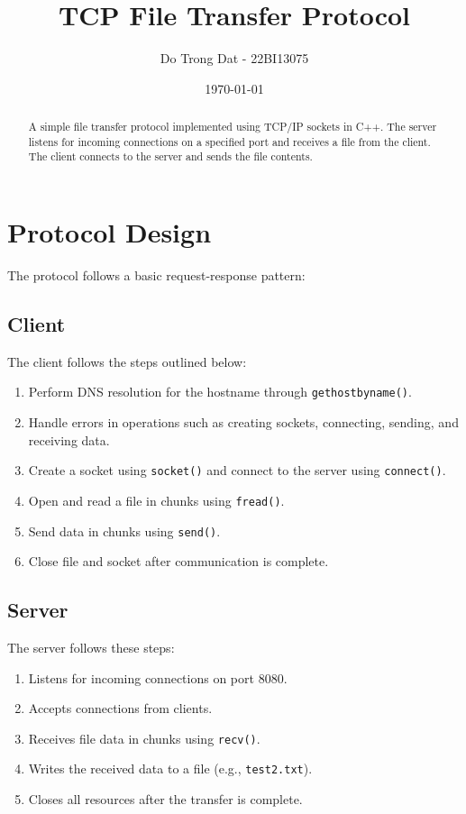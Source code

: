 \documentclass{article}
\begin{document}
\title{TCP File Transfer Protocol}
\author{Do Trong Dat - 22BI13075}
\date{\today}

\maketitle

\begin{abstract}
A simple file transfer protocol implemented using TCP/IP sockets in C++. The server listens for incoming connections on a specified port and receives a file from the client. The client connects to the server and sends the file contents.
\end{abstract}

\section{Protocol Design}

The protocol follows a basic request-response pattern:

\subsection{Client}

The client follows the steps outlined below:

\begin{enumerate}
    \item Perform DNS resolution for the hostname through \texttt{gethostbyname()}.
    \item Handle errors in operations such as creating sockets, connecting, sending, and receiving data.
    \item Create a socket using \texttt{socket()} and connect to the server using \texttt{connect()}.
    \item Open and read a file in chunks using \texttt{fread()}.
    \item Send data in chunks using \texttt{send()}.
    \item Close file and socket after communication is complete.
\end{enumerate}


\subsection{Server}

The server follows these steps:

\begin{enumerate}
    \item Listens for incoming connections on port 8080.
    \item Accepts connections from clients.
    \item Receives file data in chunks using \texttt{recv()}.
    \item Writes the received data to a file (e.g., \texttt{test2.txt}).
    \item Closes all resources after the transfer is complete.
\end{enumerate}
\end{document}
